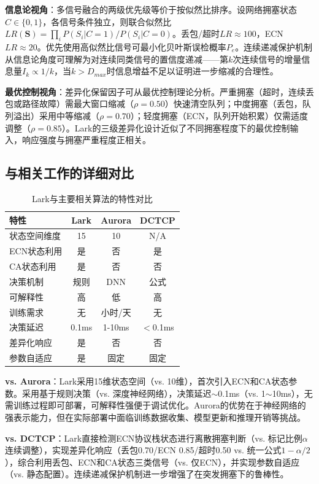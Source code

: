 \documentclass[10pt,twocolumn]{article}
\begin{document}
\textbf{信息论视角}：多信号融合的两级优先级等价于按似然比排序。设网络拥塞状态$C \in \{0,1\}$，各信号条件独立，则联合似然比$LR(\mathbf{S}) = \prod_i P(S_i|C=1)/P(S_i|C=0)$。丢包/超时$LR \approx 100$，ECN $LR \approx 20$。优先使用高似然比信号可最小化贝叶斯误检概率$P_e$。连续递减保护机制从信息论角度可理解为对连续同类信号的置信度递减——第$k$次连续信号的增量信息量$I_k \propto 1/k$，当$k > D_{max}$时信息增益不足以证明进一步缩减的合理性。

\textbf{最优控制视角}：差异化保留因子可从最优控制理论分析。严重拥塞（超时，连续丢包或路径故障）需最大窗口缩减（$\rho=0.50$）快速清空队列；中度拥塞（丢包，队列溢出）采用中等缩减（$\rho=0.70$）；轻度拥塞（ECN，队列开始积累）仅需适度调整（$\rho=0.85$）。Lark的三级差异化设计近似了不同拥塞程度下的最优控制输入，响应强度与拥塞严重程度正相关。

\subsection{与相关工作的详细对比}

\begin{table}[htbp]
\centering
\caption{Lark与主要相关算法的特性对比}
\label{tab:comparison}
\small
\begin{tabular}{lccc}
\toprule
\textbf{特性} & \textbf{Lark} & \textbf{Aurora} & \textbf{DCTCP} \\
\midrule
状态空间维度 & 15 & 10 & N/A \\
ECN状态利用 & 是 & 否 & 是 \\
CA状态利用 & 是 & 否 & 否 \\
决策机制 & 规则 & DNN & 公式 \\
可解释性 & 高 & 低 & 高 \\
训练需求 & 无 & 小时/天 & 无 \\
决策延迟 & 0.1ms & 1-10ms & $<$0.1ms \\
差异化响应 & 是 & 否 & 否 \\
参数自适应 & 是 & 固定 & 固定 \\
\bottomrule
\end{tabular}
\end{table}

\textbf{vs. Aurora\cite{aurora}}：Lark采用15维状态空间（vs. 10维），首次引入ECN和CA状态参数。采用基于规则决策（vs. 深度神经网络），决策延迟$\sim$0.1ms（vs. 1$\sim$10ms），无需训练过程即可部署，可解释性强便于调试优化。Aurora的优势在于神经网络的强表示能力，但在实际部署中面临训练数据收集、模型更新和推理开销等挑战。

\textbf{vs. DCTCP\cite{dctcp}}：Lark直接检测ECN协议栈状态进行离散拥塞判断（vs. 标记比例$\alpha$连续调整），实现差异化响应（丢包0.70/ECN 0.85/超时0.50 vs. 统一公式$1-\alpha/2$），综合利用丢包、ECN和CA状态三类信号（vs. 仅ECN），并实现参数自适应（vs. 静态配置）。连续递减保护机制进一步增强了在突发拥塞下的鲁棒性。
\end{document}
